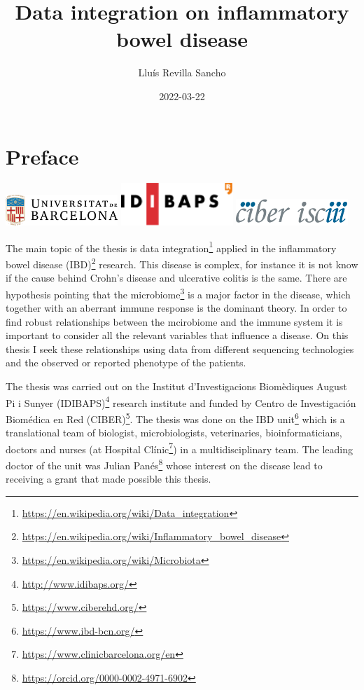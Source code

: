 \documentclass[
  a4paper,
]{book}
\title{Data integration on inflammatory bowel disease}
\author{Lluís Revilla Sancho}
\date{2022-03-22}
\DeclareRobustCommand{\href}[2]{#2\footnote{\url{#1}}}
\begin{document}
\maketitle

{
\hypersetup{linkcolor=}
\setcounter{tocdepth}{2}
\tableofcontents
}
\listoffigures
\listoftables
\hypertarget{preface}{%
\chapter*{Preface}\label{preface}}

\includegraphics[width=1.66667in,height=\textheight]{images/ub_logo.png} \includegraphics[width=1.66667in,height=\textheight]{images/idibaps_logo.png} \includegraphics[width=1.66667in,height=0.39583in]{images/logo_ciber.png}

The main topic of the thesis is \href{https://en.wikipedia.org/wiki/Data_integration}{data integration} applied in the \href{https://en.wikipedia.org/wiki/Inflammatory_bowel_disease}{inflammatory bowel disease (IBD)} research.
This disease is complex, for instance it is not know if the cause behind Crohn's disease and ulcerative colitis is the same.
There are hypothesis pointing that the \href{https://en.wikipedia.org/wiki/Microbiota}{microbiome} is a major factor in the disease, which together with an aberrant immune response is the dominant theory.
In order to find robust relationships between the mcirobiome and the immune system it is important to consider all the relevant variables that influence a disease.
On this thesis I seek these relationships using data from different sequencing technologies and the observed or reported phenotype of the patients.

The thesis was carried out on the \href{http://www.idibaps.org/}{Institut d'Investigacions Biomèdiques August Pi i Sunyer (IDIBAPS)} research institute and funded by \href{https://www.ciberehd.org/}{Centro de Investigación Biomédica en Red (CIBER)}.
The thesis was done on \href{https://www.ibd-bcn.org/}{the IBD unit} which is a translational team of biologist, microbiologists, veterinaries, bioinformaticians, doctors and nurses (at \href{https://www.clinicbarcelona.org/en}{Hospital Clínic}) in a multidisciplinary team.
The leading doctor of the unit was \href{https://orcid.org/0000-0002-4971-6902}{Julian Panés} whose interest on the disease lead to receiving a grant that made possible this thesis.
\end{document}
